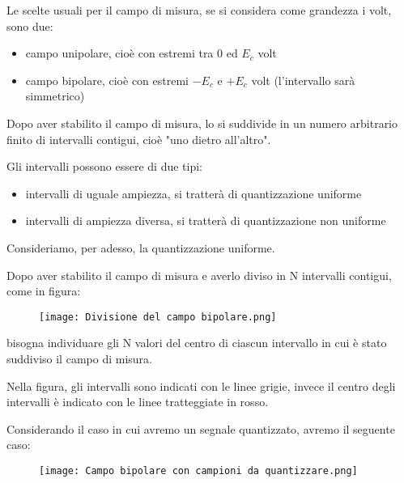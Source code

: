 Le scelte usuali per il campo di misura, se si considera come grandezza i volt, sono due: 

\begin{itemize}
    \item campo unipolare, cioè con estremi tra 0 ed $E_c$ volt 
    \item campo bipolare, cioè con estremi $-E_c$ e $+E_c$ volt (l'intervallo sarà simmetrico) 
\end{itemize}


Dopo aver stabilito il campo di misura, 
lo si suddivide in un numero arbitrario finito di intervalli contigui, cioè "uno dietro all'altro". \newline 

Gli intervalli possono essere di due tipi: 

\begin{itemize}
    \item intervalli di uguale ampiezza, si tratterà di quantizzazione uniforme 
    \item intervalli di ampiezza diversa, si tratterà di quantizzazione non uniforme
\end{itemize}

Consideriamo, per adesso, la quantizzazione uniforme. \newline 

Dopo aver stabilito il campo di misura e averlo diviso in N intervalli contigui, come in figura: 

\begin{figure}[h]
    \centering
    \texttt{[image: Divisione del campo bipolare.png]}
\end{figure} 

bisogna individuare gli N valori del centro di ciascun intervallo in cui è stato suddiviso il campo di misura. \newline 

Nella figura, gli intervalli sono indicati con le linee grigie, 
invece il centro degli intervalli è indicato con le linee tratteggiate in rosso. \newline 

Considerando il caso in cui avremo un segnale quantizzato, 
avremo il seguente caso:

\begin{figure}[h]
    \centering
    \texttt{[image: Campo bipolare con campioni da quantizzare.png]}
\end{figure} 

\newpage 

